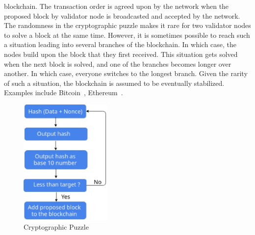 blockchain. The transaction order is agreed upon by the network when the
proposed block by validator node is broadcasted and accepted by the network.
The randomness in the cryptographic puzzle makes it rare for two validator
nodes to solve a block at the same time.  However, it is sometimes possible to
reach such a situation leading into several branches of the blockchain. In
which case, the nodes build upon the block that they first received. This
situation gets solved when the next block is solved, and one of the branches
becomes longer over another. In which case, everyone switches to the longest
branch. Given the rarity of such a situation, the blockchain is assumed to be
eventually stabilized. Examples include Bitcoin~\cite{Bitcoin_Satoshi},
Ethereum~\cite{buterin2013ethereum}. 
\begin{figure}
	\begin{center}
	\includegraphics[width=0.4\textwidth]{Images/cryptographicpuzzle.eps}
	\caption{Cryptographic Puzzle}
	\label{fig:cryptographicPuzzle}
	\end{center}
\end{figure}
